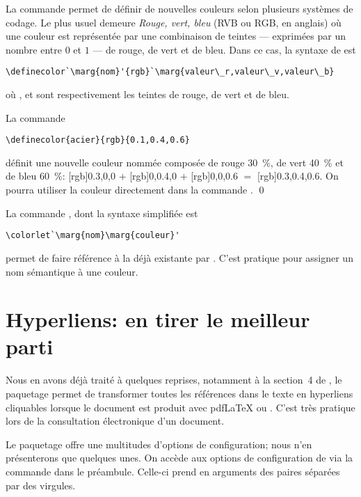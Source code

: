 La commande \cmd{\definecolor} permet de définir de nouvelles couleurs
selon plusieurs systèmes de codage. Le plus usuel demeure \emph{Rouge,
  vert, bleu} (RVB ou RGB, en anglais) où une couleur est représentée
par une combinaison de teintes --- exprimées par un nombre entre $0$
et $1$ --- de rouge, de vert et de bleu. Dans ce cas, la syntaxe de
\cmd{\definecolor} est
\begin{lstlisting}
\definecolor`\marg{nom}'{rgb}`\marg{valeur\_r,valeur\_v,valeur\_b}
\end{lstlisting}
où ,  et  sont
respectivement les teintes de rouge, de vert et de bleu.

\begin{exemple}
  La commande
\begin{lstlisting}
\definecolor{acier}{rgb}{0.1,0.4,0.6}
\end{lstlisting}
  définit une nouvelle couleur nommée  composée de rouge
  30~\%, de vert 40~\% et de bleu 60~\%: %
  [rgb]{0.3,0,0}{\phantom{xx}} $+$ %
  [rgb]{0,0.4,0}{\phantom{xx}} $+$ %
  [rgb]{0,0,0.6}{\phantom{xx}} $=$ %
  [rgb]{0.3,0.4,0.6}{\phantom{xx}}. %
  On pourra utiliser la couleur  directement dans la
  commande \cmdprint{\color}. %
  \qed
\end{exemple}

La commande , dont la syntaxe simplifiée est
\begin{lstlisting}
\colorlet`\marg{nom}\marg{couleur}'
\end{lstlisting}
permet de faire référence à la  déjà existante par
. C'est pratique pour assigner un nom sémantique à une
couleur.



\section{Hyperliens: en tirer le meilleur parti}
\label{sec:trucs:hyperliens}

Nous en avons déjà traité à quelques reprises, notamment à la
section~4 de \citet{UL:latex:1}, le paquetage 
\citep{hyperref} permet de transformer toutes les références dans le
texte en hyperliens cliquables lorsque le document est produit avec
pdf{\LaTeX} ou {\XeLaTeX}. C'est très pratique lors de la consultation
électronique d'un document.

Le paquetage offre une multitudes d'options de configuration; nous
n'en présenterons que quelques unes. On accède aux options de
configuration de  via la commande \cmd{\hypersetup} dans
le préambule. Celle-ci prend en arguments des paires
 séparées par des virgules.

